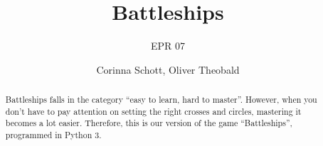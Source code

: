 \documentclass[12pt]{scrartcl}
\author{Corinna Schott, Oliver Theobald}
\title{Battleships}
\subtitle{EPR 07}
\begin{document}
	\maketitle
	\begin{abstract}
		Battleships falls in the category \enquote{easy to learn, hard to master}. However, when you don't have to pay attention on setting the right crosses and circles, mastering it becomes a lot easier. Therefore, this is our version of the game \enquote{Battleships}, programmed in Python 3.
	\end{abstract}
	\tableofcontents
	\clearpage	
\end{document}
